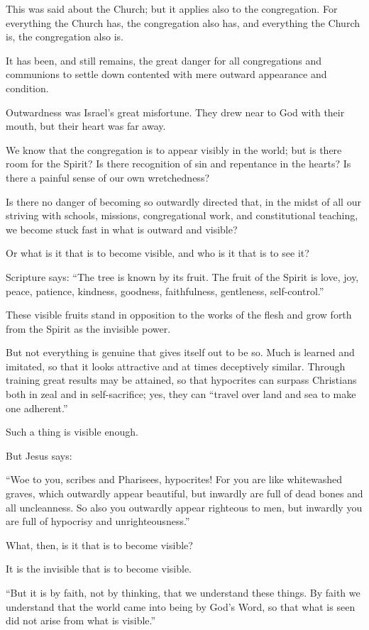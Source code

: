 This was said about the Church; but it applies also to the congregation. For everything the Church has, the congregation also has, and everything the Church is, the congregation also is.

It has been, and still remains, the great danger for all congregations and communions to settle down contented with mere outward appearance and condition.

Outwardness was Israel’s great misfortune. They drew near to God with their mouth, but their heart was far away.

We know that the congregation is to appear visibly in the world; but is there room for the Spirit? Is there recognition of sin and repentance in the hearts? Is there a painful sense of our own wretchedness?

Is there no danger of becoming so outwardly directed that, in the midst of all our striving with schools, missions, congregational work, and constitutional teaching, we become stuck fast in what is outward and visible?

Or what is it that is to become visible, and who is it that is to see it?

Scripture says: “The tree is known by its fruit. The fruit of the Spirit is love, joy, peace, patience, kindness, goodness, faithfulness, gentleness, self-control.”

These visible fruits stand in opposition to the works of the flesh and grow forth from the Spirit as the invisible power.

But not everything is genuine that gives itself out to be so. Much is learned and imitated, so that it looks attractive and at times deceptively similar. Through training great results may be attained, so that hypocrites can surpass Christians both in zeal and in self-sacrifice; yes, they can “travel over land and sea to make one adherent.”

Such a thing is visible enough.

But Jesus says:

“Woe to you, scribes and Pharisees, hypocrites! For you are like whitewashed graves, which outwardly appear beautiful, but inwardly are full of dead bones and all uncleanness. So also you outwardly appear righteous to men, but inwardly you are full of hypocrisy and unrighteousness.”

What, then, is it that is to become visible?

It is the invisible that is to become visible.

“But it is by faith, not by thinking, that we understand these things. By faith we understand that the world came into being by God’s Word, so that what is seen did not arise from what is visible.”

